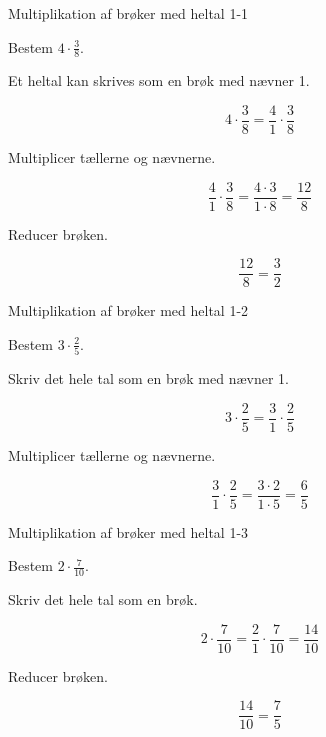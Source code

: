 \documentclass{article}
\begin{document}

\tableofcontents
\newpage

\begin{exercise}{Multiplikation af brøker med heltal 1-1}

Bestem $4 \cdot \frac{3}{8}$.


\hint

Et heltal kan skrives som en brøk med nævner 1.

\hint
\[
4 \cdot \frac{3}{8} = \frac{4}{1} \cdot \frac{3}{8}
\]

\hint

Multiplicer tællerne og nævnerne.

\hint
\[
\frac{4}{1} \cdot \frac{3}{8} = \frac{4 \cdot 3}{1 \cdot 8} = \frac{12}{8}
\]

\hint

Reducer brøken.

\hint
\[
\frac{12}{8} = \frac{3}{2}
\]

\end{exercise}

\newpage

\begin{exercise}{Multiplikation af brøker med heltal 1-2}

Bestem $3 \cdot \frac{2}{5}$.


\hint

Skriv det hele tal som en brøk med nævner 1.

\hint
\[
3 \cdot \frac{2}{5} = \frac{3}{1} \cdot \frac{2}{5}
\]

\hint

Multiplicer tællerne og nævnerne.

\hint
\[
\frac{3}{1} \cdot \frac{2}{5} = \frac{3 \cdot 2}{1 \cdot 5} = \frac{6}{5}
\]

\end{exercise}

\newpage

\begin{exercise}{Multiplikation af brøker med heltal 1-3}

Bestem $2 \cdot \frac{7}{10}$.


\hint

Skriv det hele tal som en brøk.

\hint
\[
2 \cdot \frac{7}{10} = \frac{2}{1} \cdot \frac{7}{10} = \frac{14}{10}
\]

\hint

Reducer brøken.

\hint
\[
\frac{14}{10} = \frac{7}{5}
\]

\end{exercise}
\end{document}
